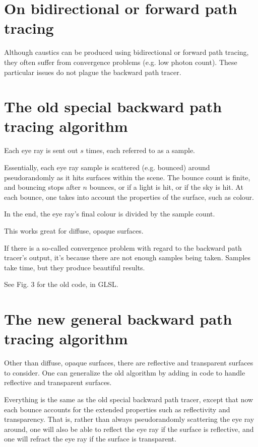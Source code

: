 \documentclass[12pt]{article}
\begin{document}
\section{On bidirectional or forward path tracing}

Although caustics can be produced using bidirectional or forward path tracing, they often suffer from convergence problems (e.g. low photon count).
These particular issues do not plague the backward path tracer.







\section{The old special backward path tracing algorithm}

Each eye ray is sent out $s$ times, each referred to as a sample.

Essentially, each eye ray sample is scattered (e.g. bounced) around pseudorandomly as it hits surfaces within the scene.
The bounce count is finite, and bouncing stops after $n$ bounces, or if a light is hit, or if the sky is hit.
At each bounce, one takes into account the properties of the surface, such as colour.

In the end, the eye ray's final colour is divided by the sample count.

This works great for diffuse, opaque surfaces.

If there is a so-called convergence problem with regard to the backward path tracer's output, it's because there are not enough samples being taken.
Samples take time, but they produce beautiful results.

See Fig. 3 for the old code, in GLSL.





\section{The new general backward path tracing algorithm}

Other than diffuse, opaque surfaces, there are reflective and transparent surfaces to consider.
One can generalize the old algorithm by adding in code to handle reflective and transparent surfaces.

Everything is the same as the old special backward path tracer, except that now each bounce accounts for the extended properties such as reflectivity and transparency.
That is, rather than always pseudorandomly scattering the eye ray around, one will also be able to reflect the eye ray if the surface is reflective, and one will refract the eye ray if the surface is transparent.
\end{document}

